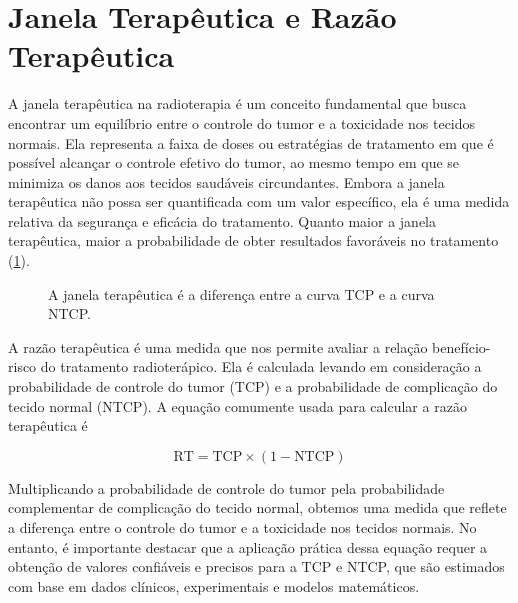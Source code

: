 \documentclass[11pt,a4paper]{article}
\begin{document}
\section{Janela Terapêutica e Razão Terapêutica}


	A janela terapêutica na radioterapia é um conceito fundamental que busca encontrar um equilíbrio entre o controle do tumor e a toxicidade nos tecidos normais. Ela representa a faixa de doses ou estratégias de tratamento em que é possível alcançar o controle efetivo do tumor, ao mesmo tempo em que se minimiza os danos aos tecidos saudáveis circundantes. Embora a janela terapêutica não possa ser quantificada com um valor específico, ela é uma medida relativa da segurança e eficácia do tratamento. Quanto maior a janela terapêutica, maior a probabilidade de obter resultados favoráveis no tratamento (\ref{fig:TcpENtcp}).

	\begin{figure}[h]
		\centering
		\caption{A janela terapêutica é a diferença entre a curva TCP e a curva NTCP.}
		\label{fig:TcpENtcp}
	\end{figure}

	A razão terapêutica é uma medida que nos permite avaliar a relação benefício-risco do tratamento radioterápico. Ela é calculada levando em consideração a probabilidade de controle do tumor (TCP) e a probabilidade de complicação do tecido normal (NTCP). A equação comumente usada para calcular a razão terapêutica é 
	
	\begin{equation}
		\text{RT} = \text{TCP} \times (1 - \text{NTCP})
	\end{equation}
	
	Multiplicando a probabilidade de controle do tumor pela probabilidade complementar de complicação do tecido normal, obtemos uma medida que reflete a diferença entre o controle do tumor e a toxicidade nos tecidos normais. No entanto, é importante destacar que a aplicação prática dessa equação requer a obtenção de valores confiáveis e precisos para a TCP e NTCP, que são estimados com base em dados clínicos, experimentais e modelos matemáticos.
\end{document}
